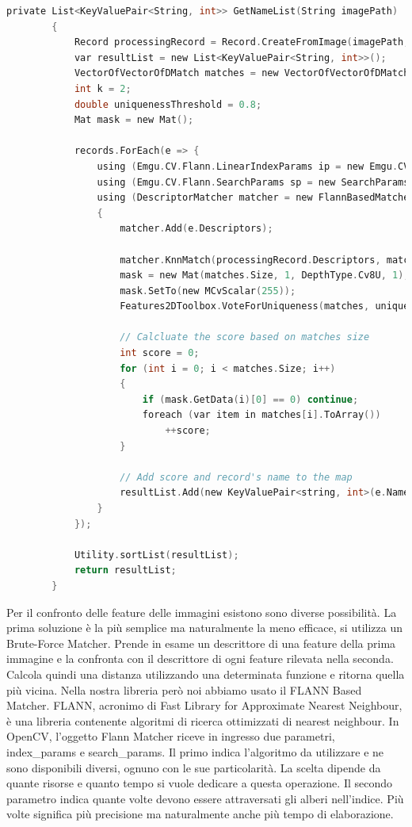 \documentclass[twoside]{supsistudent}
\begin{document}
\begin{lstlisting}[language=C]
 private List<KeyValuePair<String, int>> GetNameList(String imagePath)
        {
            Record processingRecord = Record.CreateFromImage(imagePath, "");
            var resultList = new List<KeyValuePair<String, int>>();
            VectorOfVectorOfDMatch matches = new VectorOfVectorOfDMatch();
            int k = 2;
            double uniquenessThreshold = 0.8;
            Mat mask = new Mat();

            records.ForEach(e => {
                using (Emgu.CV.Flann.LinearIndexParams ip = new Emgu.CV.Flann.LinearIndexParams())
                using (Emgu.CV.Flann.SearchParams sp = new SearchParams())
                using (DescriptorMatcher matcher = new FlannBasedMatcher(ip, sp))
                {
                    matcher.Add(e.Descriptors);

                    matcher.KnnMatch(processingRecord.Descriptors, matches, k, null);
                    mask = new Mat(matches.Size, 1, DepthType.Cv8U, 1);
                    mask.SetTo(new MCvScalar(255));
                    Features2DToolbox.VoteForUniqueness(matches, uniquenessThreshold, mask);

                    // Calcluate the score based on matches size
                    int score = 0;
                    for (int i = 0; i < matches.Size; i++)
                    {
                        if (mask.GetData(i)[0] == 0) continue;
                        foreach (var item in matches[i].ToArray())
                            ++score;
                    }

                    // Add score and record's name to the map
                    resultList.Add(new KeyValuePair<string, int>(e.Name, score));
                }
            });

            Utility.sortList(resultList);
            return resultList;
        }
\end{lstlisting}
Per il confronto delle feature delle immagini esistono sono diverse possibilità. La prima soluzione è la più semplice ma naturalmente la meno efficace, si utilizza un Brute-Force Matcher. Prende in esame un descrittore di una feature della prima immagine e la confronta con il descrittore di ogni feature rilevata nella seconda. Calcola quindi una distanza utilizzando una determinata funzione e ritorna quella più vicina. Nella nostra libreria però noi abbiamo usato il FLANN Based Matcher. FLANN, acronimo di Fast Library for Approximate Nearest Neighbour, è una libreria contenente algoritmi di ricerca ottimizzati di nearest neighbour. In OpenCV, l'oggetto Flann Matcher riceve in ingresso due parametri, index\_params e search\_params. Il primo indica l'algoritmo da utilizzare e ne sono disponibili diversi, ognuno con le sue particolarità. La scelta dipende da quante risorse e quanto tempo si vuole dedicare a questa operazione. Il secondo parametro indica quante volte devono essere attraversati gli alberi nell'indice. Più volte significa più precisione ma naturalmente anche più tempo di elaborazione. 
\end{document}

